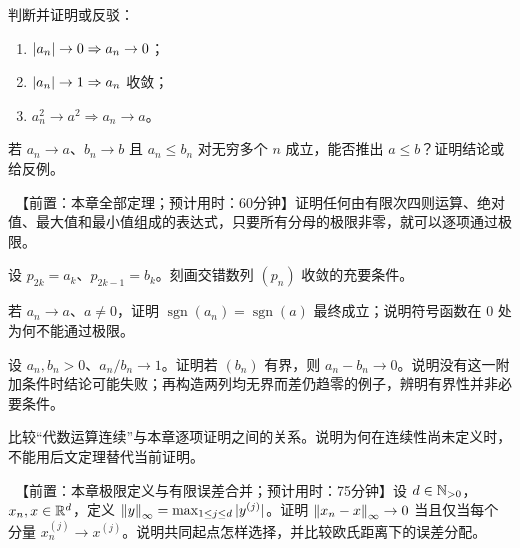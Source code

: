 \begin{enumerate}[label=\textbf{\thechapter.\arabic*.},ref=\thechapter.\arabic*,leftmargin=3.4em,labelsep=0.7em,itemsep=0.85em,topsep=0.8em,resume]
  判断并证明或反驳：
 \begin{enumerate}[label=(\arabic*)]
  \item \(\left|a_n\right|\to0\Rightarrow a_n\to0\)；
  \item \(\left|a_n\right|\to1\Rightarrow a_n\) 收敛；
  \item \(a_n^2\to a^2\Rightarrow a_n\to a\)。
 \end{enumerate}

  若 \(a_n\to a\)、\(b_n\to b\) 且 \(a_n\le b_n\) 对无穷多个 \(n\) 成立，能否推出 \(a\le b\)？证明结论或给反例。

 \ 【前置：本章全部定理；预计用时：60分钟】证明任何由有限次四则运算、绝对值、最大值和最小值组成的表达式，只要所有分母的极限非零，就可以逐项通过极限。

  设
 \(p_{2k}=a_k\)、\(p_{2k-1}=b_k\)。刻画交错数列 \((p_n)\) 收敛的充要条件。

  若 \(a_n\to a\)、\(a\ne0\)，证明 \(\operatorname{sgn}(a_n)=\operatorname{sgn}(a)\) 最终成立；说明符号函数在 \(0\) 处为何不能通过极限。

  设 \(a_n,b_n>0\)、\(a_n/b_n\to1\)。证明若 \((b_n)\) 有界，则 \(a_n-b_n\to0\)。说明没有这一附加条件时结论可能失败；再构造两列均无界而差仍趋零的例子，辨明有界性并非必要条件。

  比较“代数运算连续”与本章逐项证明之间的关系。说明为何在连续性尚未定义时，不能用后文定理替代当前证明。

 \ 【前置：本章极限定义与有限误差合并；预计用时：75分钟】设 \(d\in\mathbb{N}_{>0}\)，\(x_n,x\in\mathbb{R}^d\)，定义 \(\left\lVert y\right\rVert_\infty=\max_{1\le j\le d}|y^{(j)}|\)。证明 \(\left\lVert x_n-x\right\rVert_\infty\to0\) 当且仅当每个分量 \(x_n^{(j)}\to x^{(j)}\)。说明共同起点怎样选择，并比较欧氏距离下的误差分配。
\end{enumerate}
